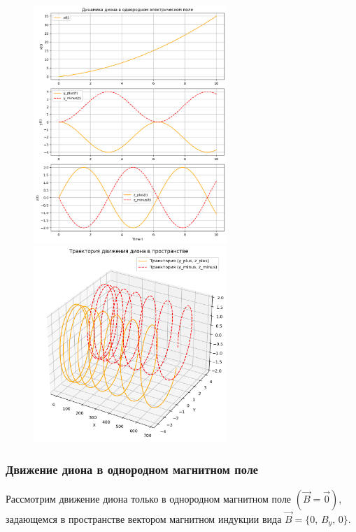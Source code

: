 \documentclass[oneside,final,14pt]{extarticle}
\begin{document}
	\begin{figure}
		\centering
		\includegraphics[width=0.65\textwidth]{dion_E.png}
		\label{fig:label}
		\includegraphics[width=0.65\textwidth]{dion_E_xyz.png}
		\label{fig:label_1}
	\end{figure}
	
	\newpage
	\subsubsection{Движение диона в однородном магнитном поле}
	
	\noindent Рассмотрим движение диона только в однородном магнитном поле $(\vec{B} = \vec{0})$, задающемся в пространстве вектором магнитном индукции вида $\vec{B} = \{0,\, B_{y},\, 0\}$. \\
	
\end{document}

